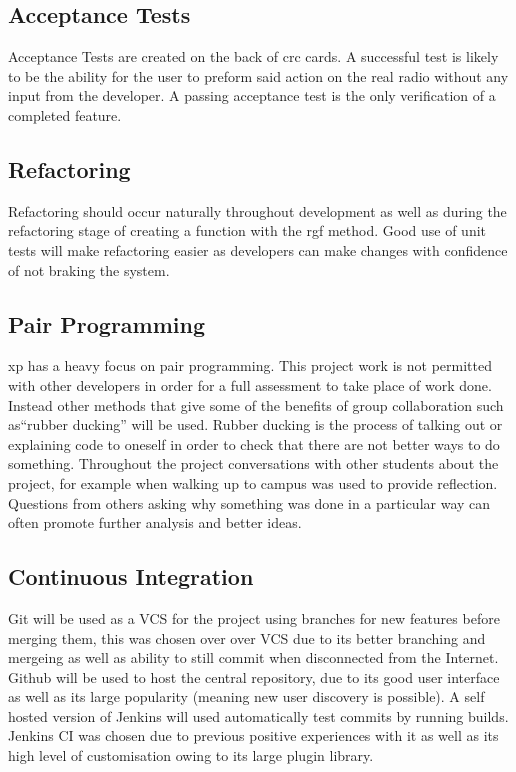 \subsection*{Acceptance Tests}
Acceptance Tests are created on the back of \gls{crc} cards. A successful test is likely to be the ability for the user to preform said action on the real radio without any input from the developer. A passing acceptance test is the only verification of a completed feature.

\subsection*{Refactoring}
Refactoring should occur naturally throughout development as well as during the refactoring stage of creating a function with the \gls{rgf} method. Good use of unit tests will make refactoring easier as developers can make changes with confidence of not braking the system.

\subsection*{Pair Programming}
\gls{xp} has a heavy focus on pair programming. This project work is not permitted with other developers in order for a full assessment to take place of work done. Instead other methods that give some of the benefits of group collaboration such as``rubber ducking'' will be used. Rubber ducking is the process of talking out or explaining code to oneself in order to check that there are not better ways to do something. Throughout the project conversations with other students about the project, for example when walking up to campus was used to provide reflection. Questions from others asking why something was done in a particular way can often promote further analysis and better ideas.

\subsection*{Continuous Integration}
Git will be used as a VCS for the project using branches for new features before merging them, this was chosen over over VCS due to its better branching and mergeing as well as ability to still commit when disconnected from the Internet. Github will be used to host the central repository, due to its good user interface as well as its large popularity (meaning new user discovery is possible). A self hosted version of Jenkins\cite{jenkins} will used automatically test commits by running builds. Jenkins CI was chosen due to previous positive experiences with it as well as its high level of customisation owing to its large plugin library. 

